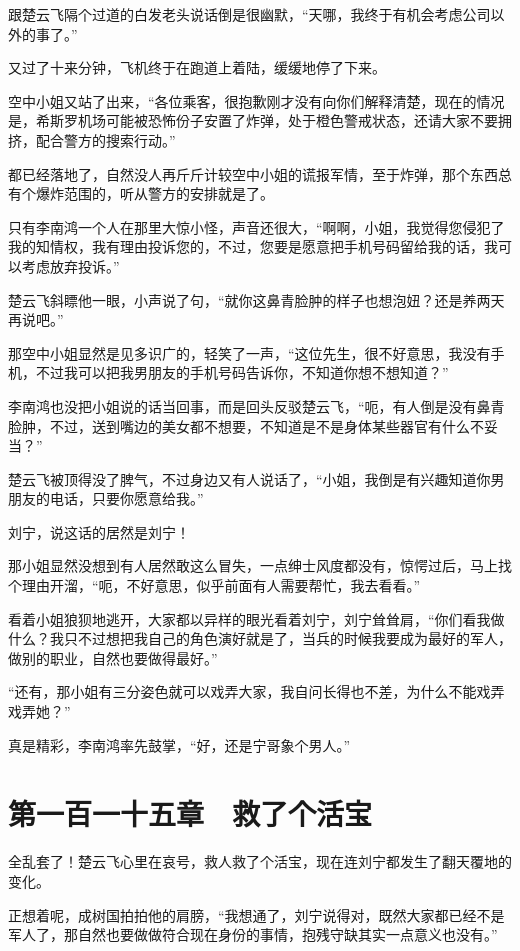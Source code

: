跟楚云飞隔个过道的白发老头说话倒是很幽默，“天哪，我终于有机会考虑公司以外的事了。”

又过了十来分钟，飞机终于在跑道上着陆，缓缓地停了下来。

空中小姐又站了出来，“各位乘客，很抱歉刚才没有向你们解释清楚，现在的情况是，希斯罗机场可能被恐怖份子安置了炸弹，处于橙色警戒状态，还请大家不要拥挤，配合警方的搜索行动。”

都已经落地了，自然没人再斤斤计较空中小姐的谎报军情，至于炸弹，那个东西总有个爆炸范围的，听从警方的安排就是了。

只有李南鸿一个人在那里大惊小怪，声音还很大，“啊啊，小姐，我觉得您侵犯了我的知情权，我有理由投诉您的，不过，您要是愿意把手机号码留给我的话，我可以考虑放弃投诉。”

楚云飞斜瞟他一眼，小声说了句，“就你这鼻青脸肿的样子也想泡妞？还是养两天再说吧。”

那空中小姐显然是见多识广的，轻笑了一声，“这位先生，很不好意思，我没有手机，不过我可以把我男朋友的手机号码告诉你，不知道你想不想知道？”

李南鸿也没把小姐说的话当回事，而是回头反驳楚云飞，“呃，有人倒是没有鼻青脸肿，不过，送到嘴边的美女都不想要，不知道是不是身体某些器官有什么不妥当？”

楚云飞被顶得没了脾气，不过身边又有人说话了，“小姐，我倒是有兴趣知道你男朋友的电话，只要你愿意给我。”

刘宁，说这话的居然是刘宁！

那小姐显然没想到有人居然敢这么冒失，一点绅士风度都没有，惊愕过后，马上找个理由开溜，“呃，不好意思，似乎前面有人需要帮忙，我去看看。”

看着小姐狼狈地逃开，大家都以异样的眼光看着刘宁，刘宁耸耸肩，“你们看我做什么？我只不过想把我自己的角色演好就是了，当兵的时候我要成为最好的军人，做别的职业，自然也要做得最好。”

“还有，那小姐有三分姿色就可以戏弄大家，我自问长得也不差，为什么不能戏弄戏弄她？”

真是精彩，李南鸿率先鼓掌，“好，还是宁哥象个男人。”

\section{第一百一十五章　救了个活宝}

全乱套了！楚云飞心里在哀号，救人救了个活宝，现在连刘宁都发生了翻天覆地的变化。

正想着呢，成树国拍拍他的肩膀，“我想通了，刘宁说得对，既然大家都已经不是军人了，那自然也要做做符合现在身份的事情，抱残守缺其实一点意义也没有。”


